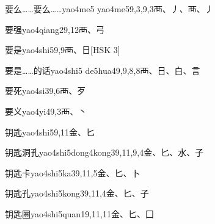 \begin{entry}{要么……要么……}{yao4me5 yao4me5}{9,3,9,3}{⾑、⼃、⾑、⼃}
\end{entry}

\begin{entry}{要强}{yao4qiang2}{9,12}{⾑、⼸}
\end{entry}

\begin{entry}{要是}{yao4shi5}{9,9}{⾑、⽇}[HSK 3]
\end{entry}

\begin{entry}{要是……的话}{yao4shi5 de5hua4}{9,9,8,8}{⾑、⽇、⽩、⾔}
\end{entry}

\begin{entry}{要死}{yao4si3}{9,6}{⾑、⽍}
\end{entry}

\begin{entry}{要义}{yao4yi4}{9,3}{⾑、⼂}
\end{entry}

\begin{entry}{钥匙}{yao4shi5}{9,11}{⾦、⼔}
\end{entry}

\begin{entry}{钥匙洞孔}{yao4shi5dong4kong3}{9,11,9,4}{⾦、⼔、⽔、⼦}
\end{entry}

\begin{entry}{钥匙卡}{yao4shi5ka3}{9,11,5}{⾦、⼔、⼘}
\end{entry}

\begin{entry}{钥匙孔}{yao4shi5kong3}{9,11,4}{⾦、⼔、⼦}
\end{entry}

\begin{entry}{钥匙圈}{yao4shi5quan1}{9,11,11}{⾦、⼔、⼞}
\end{entry}

